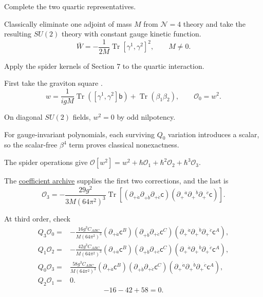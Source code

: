 \documentclass[11pt]{article}
\numberwithin{equation}{section}
\numberwithin{figure}{section}
\numberwithin{table}{section}
\begin{document}
\begin{proofbox}
Complete the two quartic representatives.

Classically eliminate one adjoint of mass $M$ from $\mathcal N=4$ theory and take the resulting $SU(2)$ theory with constant gauge kinetic function.
\begin{equation}\label{b-00867}
\bar W=-\frac1{2M}\operatorname{Tr}[\gamma^1,\gamma^2]^2,
\qquad M\ne0.
\end{equation}

Apply the spider kernels of Section 7 to the quartic interaction.

First take the graviton square \cite[Eq. (4.51)]{CK}.
\begin{equation}\label{eq-quartic-square}
w=\frac1{igM}\operatorname{Tr}([\gamma^1,\gamma^2]\mathsf b)
+\operatorname{Tr}(\beta_1\beta_2),\qquad \mathcal O_0=w^2.
\end{equation}

On diagonal $SU(2)$ fields, $w^2=0$ by odd nilpotency.

For gauge-invariant polynomials, each surviving $Q_0$ variation introduces a scalar, so the scalar-free $\beta^4$ term proves classical nonexactness.

The spider operations give $\mathcal O[w^2]=w^2+\hbar\mathcal O_1+\hbar^2\mathcal O_2+\hbar^3\mathcal O_3$.

The \href{https://github.com/lbotao399-stack/quantum-lifts-results}{coefficient archive} supplies the first two corrections, and the last is
\begin{equation}\label{eq-quartic-third}
\mathcal O_3=-\frac{29g^2}{3M(64\pi^2)^3}
\operatorname{Tr}\!\left[
(\partial_{+\dot a}\partial_{+\dot b}\partial_{+\dot c}\mathsf c)
(\partial_+{}^{\dot a}\partial_+{}^{\dot b}\partial_+{}^{\dot c}\mathsf c)
\right].
\end{equation}

At third order, check
\begin{equation}\label{b-00874}
\begin{aligned}
Q_3\mathcal O_0={}&-\frac{16g^3C_{ABC}}{M(64\pi^2)^3}
(\partial_{+\dot a}\mathsf c^B)
(\partial_{+\dot b}\partial_{+\dot c}\mathsf c^C)
(\partial_+{}^{\dot a}\partial_+{}^{\dot b}\partial_+{}^{\dot c}\mathsf c^A),\\
Q_1\mathcal O_2={}&-\frac{42g^3C_{ABC}}{M(64\pi^2)^3}
(\partial_{+\dot a}\mathsf c^B)
(\partial_{+\dot b}\partial_{+\dot c}\mathsf c^C)
(\partial_+{}^{\dot a}\partial_+{}^{\dot b}\partial_+{}^{\dot c}\mathsf c^A),\\
Q_0\mathcal O_3={}&\frac{58g^3C_{ABC}}{M(64\pi^2)^3}
(\partial_{+\dot a}\mathsf c^B)
(\partial_{+\dot b}\partial_{+\dot c}\mathsf c^C)
(\partial_+{}^{\dot a}\partial_+{}^{\dot b}\partial_+{}^{\dot c}\mathsf c^A),\\
Q_2\mathcal O_1={}&0.
\end{aligned}
\end{equation}
\begin{equation*}
-16-42+58=0.
\end{equation*}


\end{proofbox}
\end{document}
